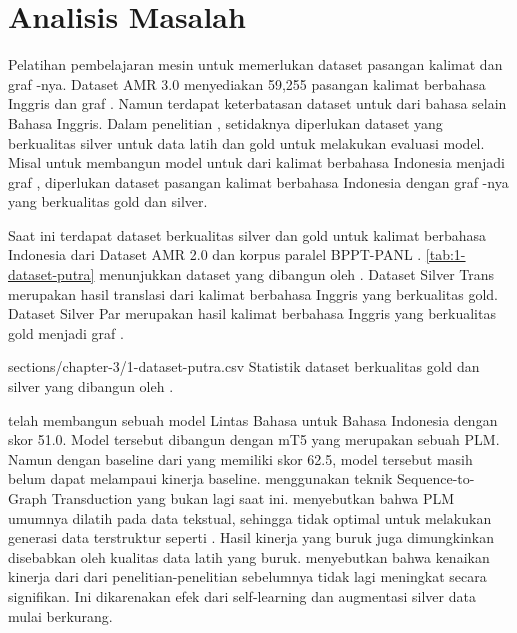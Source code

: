 \section{Analisis Masalah}

Pelatihan pembelajaran mesin untuk  \amrparsing{} memerlukan dataset  pasangan kalimat dan graf \AMR{}-nya.
Dataset AMR 3.0 menyediakan 59,255 pasangan kalimat berbahasa Inggris dan graf \AMR{}.
Namun terdapat keterbatasan dataset untuk  \amrparsing{} dari bahasa selain Bahasa Inggris.
Dalam penelitian \textcite{blloshmi2020}, setidaknya diperlukan dataset yang berkualitas silver untuk data latih dan gold untuk melakukan evaluasi model.
Misal untuk membangun model untuk \amrparsing{} dari kalimat berbahasa Indonesia menjadi graf \AMR{}, diperlukan dataset pasangan kalimat berbahasa Indonesia dengan graf \AMR{}-nya yang berkualitas gold dan silver.

Saat ini terdapat dataset berkualitas silver dan gold untuk kalimat berbahasa Indonesia dari Dataset AMR 2.0 dan korpus paralel BPPT-PANL .
\cref{tab:1-dataset-putra} menunjukkan dataset yang dibangun oleh \textcite{putra2022}.
Dataset Silver Trans merupakan hasil translasi dari kalimat berbahasa Inggris yang berkualitas gold.
Dataset Silver Par merupakan hasil  kalimat berbahasa Inggris yang berkualitas gold menjadi graf \AMR{}.

  {sections/chapter-3/1-dataset-putra.csv}
  {Statistik dataset berkualitas gold dan silver yang dibangun oleh \textcite{putra2022}.}

\textcite{putra2022} telah membangun sebuah model \AMR{}  Lintas Bahasa untuk Bahasa Indonesia dengan skor \SMATCH{} 51.0.
Model tersebut dibangun dengan \mwordem{} mT5 yang merupakan sebuah \gls{PLM}.
Namun dengan baseline dari  yang memiliki skor \SMATCH{} 62.5, model tersebut masih belum dapat melampaui kinerja baseline.
\textcite{putra2022} menggunakan teknik Sequence-to-Graph Transduction  yang bukan lagi  \amrparsing{} saat ini.
\textcite{bai2022} menyebutkan bahwa \gls{PLM} umumnya dilatih pada data tekstual, sehingga tidak optimal untuk melakukan generasi data terstruktur seperti \AMR{}.
Hasil kinerja yang buruk juga dimungkinkan disebabkan oleh kualitas data latih yang buruk.
\textcite{lee2022} menyebutkan bahwa kenaikan kinerja dari \amrparsing{} dari penelitian-penelitian sebelumnya tidak lagi meningkat secara signifikan.
Ini dikarenakan efek dari self-learning dan augmentasi silver data mulai berkurang.
